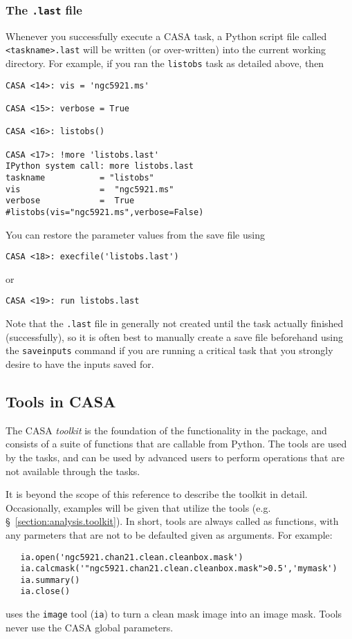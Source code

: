 \subsubsection{The {\tt .last} file}
\label{section:intro.tasks.setpar.last}

Whenever you successfully execute a CASA task, a Python script file
called {\tt <taskname>.last} will be written (or over-written) into
the current working directory.  For example, if you ran the
{\tt listobs} task as detailed above, then
\small
\begin{verbatim}
CASA <14>: vis = 'ngc5921.ms'

CASA <15>: verbose = True

CASA <16>: listobs()

CASA <17>: !more 'listobs.last'
IPython system call: more listobs.last
taskname           = "listobs"
vis                =  "ngc5921.ms"
verbose            =  True
#listobs(vis="ngc5921.ms",verbose=False)
\end{verbatim}
\normalsize

You can restore the parameter values from the save file using
\small
\begin{verbatim}
CASA <18>: execfile('listobs.last')
\end{verbatim}
\normalsize
or
\small
\begin{verbatim}
CASA <19>: run listobs.last
\end{verbatim}
\normalsize

Note that the {\tt .last} file in generally not created until
the task actually finished (successfully), so it is often best
to manually create a save file beforehand using the {\tt saveinputs} 
command if you are running a critical task that you strongly desire
to have the inputs saved for.

\subsection{Tools in CASA}
\label{section:intro.tasks.tools}

The CASA {\em toolkit} is the foundation of the functionality in the 
package, and consists of a suite of functions that are callable from
Python.  The tools are used by the tasks, and can be used by advanced
users to perform operations that are not available through the tasks.

It is beyond the scope of this reference to describe the toolkit in 
detail.  Occasionally, examples will be given that utilize the tools
(e.g. \S~\ref{section:analysis.toolkit}).
In short, tools are always called as functions, with any parmeters
that are not to be defaulted given as arguments.  For example:
\small
\begin{verbatim}
   ia.open('ngc5921.chan21.clean.cleanbox.mask')
   ia.calcmask('"ngc5921.chan21.clean.cleanbox.mask">0.5','mymask')
   ia.summary()
   ia.close()
\end{verbatim}
\normalsize
uses the {\tt image} tool ({\tt ia}) to turn a clean mask image into
an image mask.  Tools never use the CASA global parameters.

